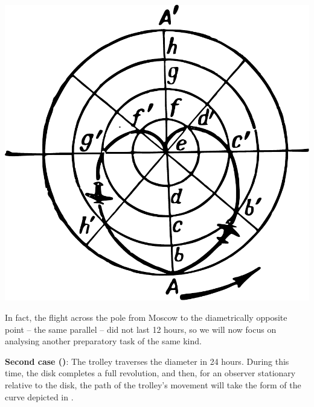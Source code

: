 \begin{marginfigure}[-4cm]%
\centering
\includegraphics[width=\textwidth]{figures/ch-09/fig-135.pdf}
\end{marginfigure}

In fact, the flight across the pole from Moscow to the diametrically opposite point -- the same parallel -- did not last 12 hours, so we will now focus on analysing another preparatory task of the same kind.


\textbf{Second case ()}: The trolley traverses the diameter in 24 hours. During this time, the disk completes a full revolution, and then, for an observer stationary relative to the disk, the path of the trolley's movement will take the form of the curve depicted in .

